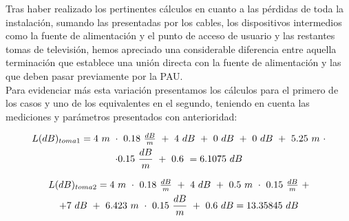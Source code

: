 \documentclass{article}[12 pt]
\begin{document}
		\vskip 3mm

		Tras haber realizado los pertinentes cálculos en cuanto a las pérdidas de toda la instalación, sumando las presentadas por los cables, los dispositivos intermedios como la fuente de alimentación y el punto de acceso de usuario y las restantes tomas de televisión, hemos apreciado una considerable diferencia entre aquella terminación que establece una unión directa con la fuente de alimentación y las que deben pasar previamente por la PAU.\\

		Para evidenciar más esta variación presentamos los cálculos para el primero de los casos y uno de los equivalentes en el segundo, teniendo en cuenta las mediciones y parámetros presentados con anterioridad:

		\begin{multline*}
			$$L(dB)_{toma1} = 4\ m\ \cdot\ 0.18\ \frac{dB}{m}\ +\ 4\ dB\ +\ 0\ dB\ +\ 0\ dB\ +\ 5.25\ m\ \cdot\\
			\cdot 0.15\ \frac{dB}{m}\ +\ 0.6\ = 6.1075\ dB$$
		\end{multline*}

		\begin{multline*}
			$$L(dB)_{toma2} = 4\ m\ \cdot\ 0.18\ \frac{dB}{m}\ +\ 4\ dB\ +\ 0.5\ m\ \cdot\ 0.15\ \frac{dB}{m}\ +\\
			+ 7\ dB\ +\ 6.423\ m\ \cdot\ 0.15\ \frac{dB}{m}\ +\ 0.6\ dB = 13.35845\ dB$$
		\end{multline*}
\end{document}
